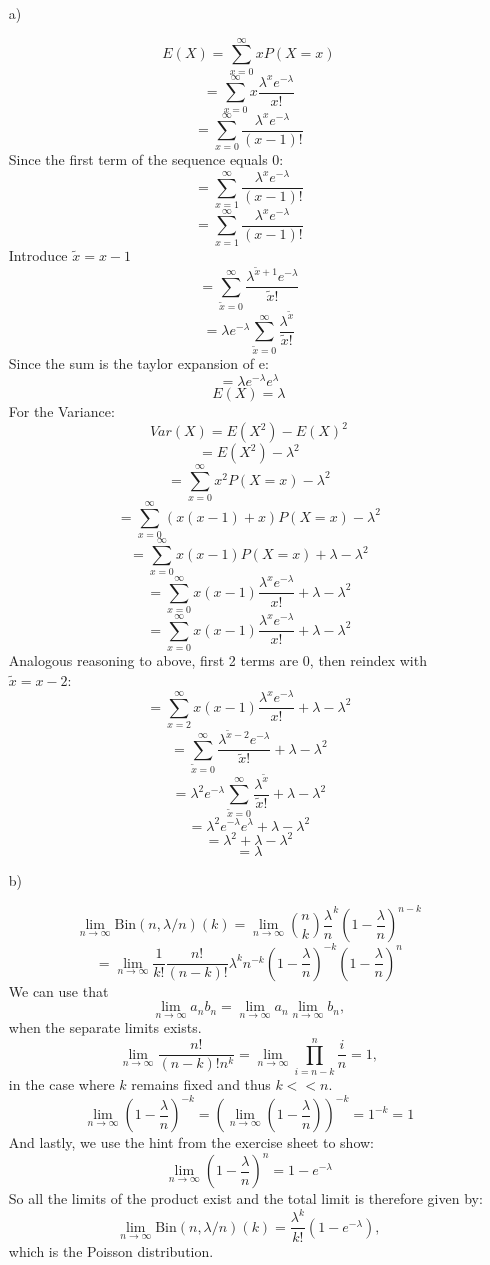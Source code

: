 \documentclass[10pt]{article}
\numberwithin{equation}{section}
\begin{document}
\begin{enumerate}
\item[a)]{
    $$E(X) = \sum_{x=0}^{\infty} x P(X=x)$$
    $$= \sum_{x=0}^{\infty} x \frac{\lambda^x e^{-\lambda}}{x!}$$
    $$= \sum_{x=0}^{\infty} \frac{\lambda^x e^{-\lambda}}{(x-1)!}$$
    Since the first term of the sequence equals 0:
    $$= \sum_{x=1}^{\infty} \frac{\lambda^x e^{-\lambda}}{(x-1)!}$$
    $$= \sum_{x=1}^{\infty} \frac{\lambda^x e^{-\lambda}}{(x-1)!}$$
    Introduce $\tilde{x} = x -1$
    $$= \sum_{\tilde{x}=0}^{\infty} \frac{\lambda^{\tilde{x}+1} e^{-\lambda}}{\tilde{x}!}$$
    $$= \lambda e^{-\lambda}\sum_{\tilde{x}=0}^{\infty} \frac{\lambda^{\tilde{x}}}{\tilde{x}!}$$
    Since the sum is the taylor expansion of e:
    $$= \lambda e^{-\lambda}e^{\lambda}$$
    $$E(X)=\lambda$$
    For the Variance:
    $$Var(X) = E(X^2) - E(X)^2$$
    $$= E(X^2) - \lambda^2$$
    $$= \sum_{x=0}^{\infty} x^2 P(X=x) - \lambda^2$$
    $$= \sum_{x=0}^{\infty} (x(x-1) + x) P(X=x) - \lambda^2$$
    $$= \sum_{x=0}^{\infty} x(x-1) P(X=x)  + \lambda - \lambda^2$$
    $$= \sum_{x=0}^{\infty} x(x-1) \frac{\lambda^x e^{-\lambda}}{x!}  + \lambda - \lambda^2$$
    $$= \sum_{x=0}^{\infty} x(x-1) \frac{\lambda^x e^{-\lambda}}{x!}  + \lambda - \lambda^2$$
    Analogous reasoning to above, first 2 terms are 0, then reindex with $\tilde{x} = x -2$:
    $$= \sum_{x=2}^{\infty} x(x-1) \frac{\lambda^x e^{-\lambda}}{x!}  + \lambda - \lambda^2$$
    $$= \sum_{\tilde{x}=0}^{\infty} \frac{\lambda^{\tilde{x} -2} e^{-\lambda}}{\tilde{x}!}  + \lambda - \lambda^2$$
    $$= \lambda^2 e^{-\lambda} \sum_{\tilde{x}=0}^{\infty} \frac{\lambda^{\tilde{x}}}{\tilde{x}!}  + \lambda - \lambda^2$$
    $$= \lambda^2 e^{-\lambda} e^{\lambda} + \lambda - \lambda^2$$
    $$= \lambda^2 + \lambda - \lambda^2$$
    $$= \lambda$$


}
\item[b)]{
$$\lim_{n\to\infty} \text{Bin}(n, \lambda/n) (k) = \lim_{n\to\infty} \binom{n}{k} {\frac{\lambda}{n}}^k \left(1 - \frac{\lambda}{n}\right)^{n-k} $$
$$=\lim_{n\to\infty} \frac{1}{k!} \frac{n!}{(n-k)!} \lambda^k n^{-k} \left(1 - \frac{\lambda}{n}\right)^{-k} \left(1 - \frac{\lambda}{n}\right)^{n}$$
We can use that $$\lim_{n\to\infty} a_n b_n = \lim_{n\to\infty} a_n \lim_{n\to\infty} b_n, $$ when the separate limits exists.
$$\lim_{n\to\infty} \frac{n!}{(n-k)!n^k}  = \lim_{n\to\infty} \prod_{i= n-k}^n \frac{i}{n} = 1, $$ in the case where $k$ remains fixed and thus $k<<n$. 
$$\lim_{n\to\infty}\left(1 - \frac{\lambda}{n}\right)^{-k} = \left(\lim_{n\to\infty} \left(1 - \frac{\lambda}{n}\right)\right)^{-k} = 1^{-k} = 1$$
And lastly, we use the hint from the exercise sheet to show:
$$\lim_{n\to\infty} \left(1 - \frac{\lambda}{n}\right)^{n} = 1  - e^{-\lambda}
$$
So all the limits of the product exist and the total limit is therefore given by:
$$
\lim_{n\to\infty} \text{Bin}(n, \lambda/n) (k) = \frac{\lambda^k}{k!}(1-e^{-\lambda}),
$$
which is the Poisson distribution. 

}
\end{enumerate}
\end{document}
